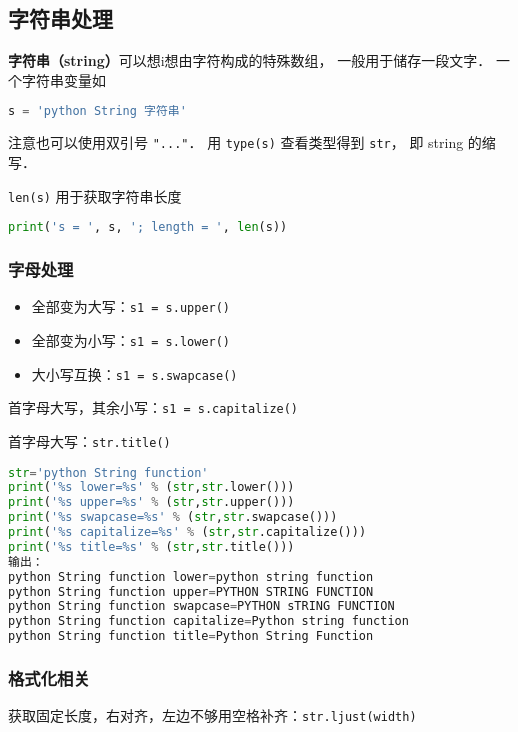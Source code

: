 

\subsection{字符串处理}
\textbf{字符串（string）}可以想i想由字符构成的特殊数组， 一般用于储存一段文字． 一个字符串变量如
\begin{lstlisting}[language=python]
s = 'python String 字符串'
\end{lstlisting}
注意也可以使用双引号 \verb|"..."|． 用 \verb|type(s)| 查看类型得到 \verb|str|， 即 string 的缩写．

\verb|len(s)| 用于获取字符串长度
\begin{lstlisting}[language=python]
print('s = ', s, '; length = ', len(s))
\end{lstlisting}

\subsubsection{字母处理}
\begin{itemize}
\item 全部变为大写：\verb|s1 = s.upper()|
\item 全部变为小写：\verb|s1 = s.lower()|
\item 大小写互换：\verb|s1 = s.swapcase()|
\end{itemize}

首字母大写，其余小写：\verb|s1 = s.capitalize()|

首字母大写：\verb|str.title()|

\begin{lstlisting}[language=python]
str='python String function'
print('%s lower=%s' % (str,str.lower()))
print('%s upper=%s' % (str,str.upper()))
print('%s swapcase=%s' % (str,str.swapcase()))
print('%s capitalize=%s' % (str,str.capitalize()))
print('%s title=%s' % (str,str.title()))
输出：
python String function lower=python string function
python String function upper=PYTHON STRING FUNCTION
python String function swapcase=PYTHON sTRING FUNCTION
python String function capitalize=Python string function
python String function title=Python String Function
\end{lstlisting}
\subsubsection{格式化相关}
获取固定长度，右对齐，左边不够用空格补齐：\verb|str.ljust(width)|

